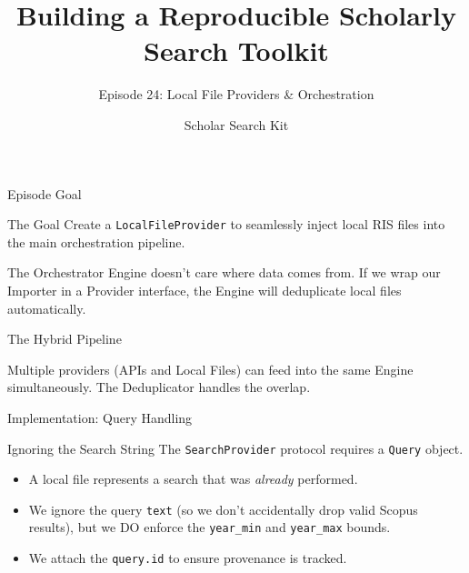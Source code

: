 \documentclass[aspectratio=169]{beamer}
\title{Building a Reproducible Scholarly Search Toolkit}
\subtitle{Episode 24: Local File Providers \& Orchestration}
\author{Scholar Search Kit}
\date{}
\begin{document}
\begin{frame}[plain]
  \titlepage
\end{frame}

\begin{frame}{Episode Goal}
  \begin{alertblock}{The Goal}
    Create a \texttt{LocalFileProvider} to seamlessly inject local RIS files into the main orchestration pipeline.
  \end{alertblock}
  \vspace{0.5cm}
  The Orchestrator Engine doesn't care where data comes from. If we wrap our Importer in a Provider interface, the Engine will deduplicate local files automatically.
\end{frame}

\begin{frame}{The Hybrid Pipeline}
  \begin{center}
  \end{center}
  \vspace{0.2cm}
  Multiple providers (APIs and Local Files) can feed into the same Engine simultaneously. The Deduplicator handles the overlap.
\end{frame}

\begin{frame}{Implementation: Query Handling}
  \begin{block}{Ignoring the Search String}
    The \texttt{SearchProvider} protocol requires a \texttt{Query} object.
  \end{block}
  
  \begin{itemize}
      \item A local file represents a search that was \textit{already} performed.
      \item We ignore the query \texttt{text} (so we don't accidentally drop valid Scopus results), but we DO enforce the \texttt{year\_min} and \texttt{year\_max} bounds.
      \item We attach the \texttt{query.id} to ensure provenance is tracked.
  \end{itemize}
\end{frame}
\end{document}
